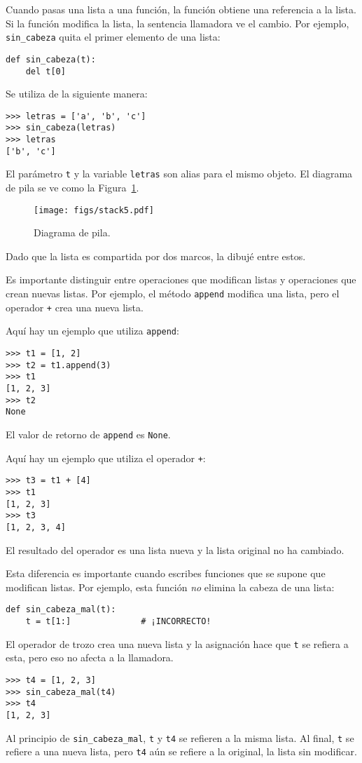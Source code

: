 \documentclass[10pt]{book}
\begin{document}
Cuando pasas una lista a una función, la función obtiene una referencia a
la lista.  Si la función modifica la lista, la sentencia llamadora ve
el cambio.  Por ejemplo, \verb"sin_cabeza" quita el primer elemento
de una lista:

\begin{verbatim}
def sin_cabeza(t):
    del t[0]
\end{verbatim}
%
Se utiliza de la siguiente manera:

\begin{verbatim}
>>> letras = ['a', 'b', 'c']
>>> sin_cabeza(letras)
>>> letras
['b', 'c']
\end{verbatim}
%
El parámetro {\tt t} y la variable {\tt letras} son
alias para el mismo objeto.  El diagrama de pila se ve como la
Figura~\ref{fig.stack5}.

\begin{figure}
\centerline
{\texttt{[image: figs/stack5.pdf]}}
\caption{Diagrama de pila.}
\label{fig.stack5}
\end{figure}

Dado que la lista es compartida por dos marcos, la dibujé
entre estos.

Es importante distinguir entre operaciones que
modifican listas y operaciones que crean nuevas listas.  Por
ejemplo, el método {\tt append} modifica una lista, pero el
operador {\tt +} crea una nueva lista.

Aquí hay un ejemplo que utiliza {\tt append}:
%
\begin{verbatim}
>>> t1 = [1, 2]
>>> t2 = t1.append(3)
>>> t1
[1, 2, 3]
>>> t2
None
\end{verbatim}
%
El valor de retorno de {\tt append} es {\tt None}.

Aquí hay un ejemplo que utiliza el operador {\tt +}:
%
\begin{verbatim}
>>> t3 = t1 + [4]
>>> t1
[1, 2, 3]
>>> t3
[1, 2, 3, 4]
\end{verbatim}
%
El resultado del operador es una lista nueva y la lista original no ha
cambiado.

Esta diferencia es importante cuando escribes funciones que
se supone que modifican listas.  Por ejemplo, esta función
{\em no} elimina la cabeza de una lista:
%
\begin{verbatim}
def sin_cabeza_mal(t):
    t = t[1:]              # ¡INCORRECTO!
\end{verbatim}
%
El operador de trozo crea una nueva lista y la asignación
hace que {\tt t} se refiera a esta, pero eso no afecta a la llamadora.
%
\begin{verbatim}
>>> t4 = [1, 2, 3]
>>> sin_cabeza_mal(t4)
>>> t4
[1, 2, 3]
\end{verbatim}
%
Al principio de \verb"sin_cabeza_mal", {\tt t} y {\tt t4}
se refieren a la misma lista.  Al final, {\tt t} se refiere a una nueva lista,
pero {\tt t4} aún se refiere a la original, la lista sin modificar.
\end{document}
